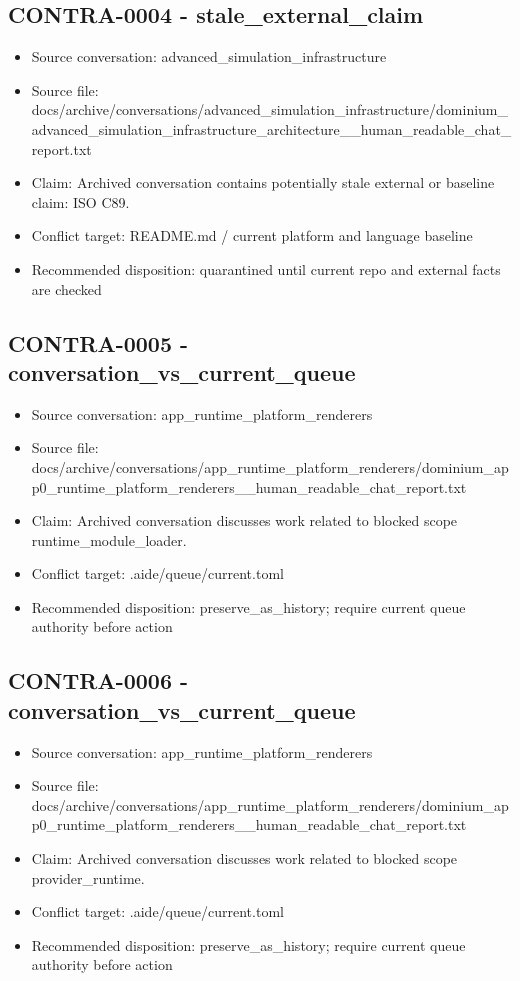 \documentclass[11pt,a4paper]{report}
\begin{document}
\subsection{CONTRA-0004 - stale\_external\_claim}

\begin{itemize}
\item Source conversation: advanced\_simulation\_infrastructure
\item Source file: docs/archive/conversations/advanced\_simulation\_infrastructure/dominium\_advanced\_simulation\_infrastructure\_architecture\_\_human\_readable\_chat\_report.txt
\item Claim: Archived conversation contains potentially stale external or baseline claim: ISO C89.
\item Conflict target: README.md / current platform and language baseline
\item Recommended disposition: quarantined until current repo and external facts are checked
\end{itemize}

\subsection{CONTRA-0005 - conversation\_vs\_current\_queue}

\begin{itemize}
\item Source conversation: app\_runtime\_platform\_renderers
\item Source file: docs/archive/conversations/app\_runtime\_platform\_renderers/dominium\_app0\_runtime\_platform\_renderers\_\_human\_readable\_chat\_report.txt
\item Claim: Archived conversation discusses work related to blocked scope runtime\_module\_loader.
\item Conflict target: .aide/queue/current.toml
\item Recommended disposition: preserve\_as\_history; require current queue authority before action
\end{itemize}

\subsection{CONTRA-0006 - conversation\_vs\_current\_queue}

\begin{itemize}
\item Source conversation: app\_runtime\_platform\_renderers
\item Source file: docs/archive/conversations/app\_runtime\_platform\_renderers/dominium\_app0\_runtime\_platform\_renderers\_\_human\_readable\_chat\_report.txt
\item Claim: Archived conversation discusses work related to blocked scope provider\_runtime.
\item Conflict target: .aide/queue/current.toml
\item Recommended disposition: preserve\_as\_history; require current queue authority before action
\end{itemize}
\end{document}
